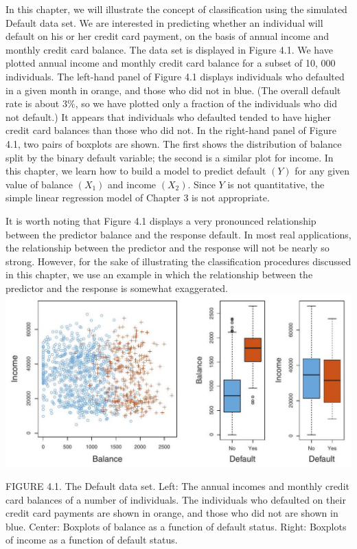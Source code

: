 \documentclass[10pt]{article}
\begin{document}
In this chapter, we will illustrate the concept of classification using the simulated Default data set. We are interested in predicting whether an individual will default on his or her credit card payment, on the basis of annual income and monthly credit card balance. The data set is displayed in Figure 4.1. We have plotted annual income and monthly credit card balance for a subset of 10, 000 individuals. The left-hand panel of Figure 4.1 displays individuals who defaulted in a given month in orange, and those who did not in blue. (The overall default rate is about $3 \%$, so we have plotted only a fraction of the individuals who did not default.) It appears that individuals who defaulted tended to have higher credit card balances than those who did not. In the right-hand panel of Figure 4.1, two pairs of boxplots are shown. The first shows the distribution of balance split by the binary default variable; the second is a similar plot for income. In this chapter, we learn how to build a model to predict default $(Y)$ for any given value of balance $\left(X_{1}\right)$ and income $\left(X_{2}\right)$. Since $Y$ is not quantitative, the simple linear regression model of Chapter 3 is not appropriate.

It is worth noting that Figure 4.1 displays a very pronounced relationship between the predictor balance and the response default. In most real applications, the relationship between the predictor and the response will not be nearly so strong. However, for the sake of illustrating the classification procedures discussed in this chapter, we use an example in which the relationship between the predictor and the response is somewhat exaggerated.\\
\includegraphics[max width=\textwidth, center]{2025_05_05_efe77898333945044de4g-144}

FIGURE 4.1. The Default data set. Left: The annual incomes and monthly credit card balances of a number of individuals. The individuals who defaulted on their credit card payments are shown in orange, and those who did not are shown in blue. Center: Boxplots of balance as a function of default status. Right: Boxplots of income as a function of default status.
\end{document}
